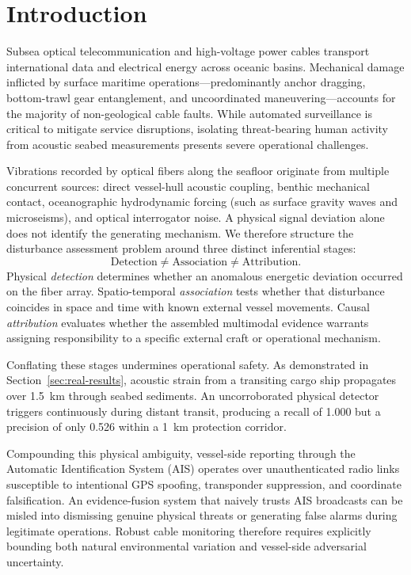 \documentclass[conference]{IEEEtran}
\begin{document}
\section{Introduction}

Subsea optical telecommunication and high-voltage power cables transport international data and electrical energy across oceanic basins. Mechanical damage inflicted by surface maritime operations---predominantly anchor dragging, bottom-trawl gear entanglement, and uncoordinated maneuvering---accounts for the majority of non-geological cable faults. While automated surveillance is critical to mitigate service disruptions, isolating threat-bearing human activity from acoustic seabed measurements presents severe operational challenges.

Vibrations recorded by optical fibers along the seafloor originate from multiple concurrent sources: direct vessel-hull acoustic coupling, benthic mechanical contact, oceanographic hydrodynamic forcing (such as surface gravity waves and microseisms), and optical interrogator noise. A physical signal deviation alone does not identify the generating mechanism. We therefore structure the disturbance assessment problem around three distinct inferential stages:
\begin{equation}
\text{Detection} \neq \text{Association} \neq \text{Attribution}.
\label{eq:principle}
\end{equation}
Physical \emph{detection} determines whether an anomalous energetic deviation occurred on the fiber array. Spatio-temporal \emph{association} tests whether that disturbance coincides in space and time with known external vessel movements. Causal \emph{attribution} evaluates whether the assembled multimodal evidence warrants assigning responsibility to a specific external craft or operational mechanism.

Conflating these stages undermines operational safety. As demonstrated in Section~\ref{sec:real-results}, acoustic strain from a transiting cargo ship propagates over 1.5~km through seabed sediments. An uncorroborated physical detector triggers continuously during distant transit, producing a recall of 1.000 but a precision of only 0.526 within a 1~km protection corridor.

Compounding this physical ambiguity, vessel-side reporting through the Automatic Identification System (AIS) operates over unauthenticated radio links susceptible to intentional GPS spoofing, transponder suppression, and coordinate falsification. An evidence-fusion system that naively trusts AIS broadcasts can be misled into dismissing genuine physical threats or generating false alarms during legitimate operations. Robust cable monitoring therefore requires explicitly bounding both natural environmental variation and vessel-side adversarial uncertainty.
\end{document}
